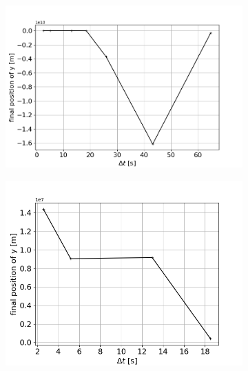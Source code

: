 \documentclass[a4paper,12pt,twoside]{article}
\begin{document}
\begin{figure}[H]
\begin{subfigure}{0.45\textwidth}  %
    \centering  %
    \includegraphics[scale=0.4]{Graphes/convergence_y_alpha_0.png}
    \captionsetup{justification = centering, font=large}
    \caption{}
\end{subfigure}
\hspace{0.05\textwidth}
\begin{subfigure}{0.45\textwidth}  %
    \centering  %
    \includegraphics[scale=0.42]{Graphes/convergence_y_alpha_0_zoom.png}
    \captionsetup{justification = centering, font=large}
    \caption{}

\end{subfigure}
\end{figure}
\end{document}

